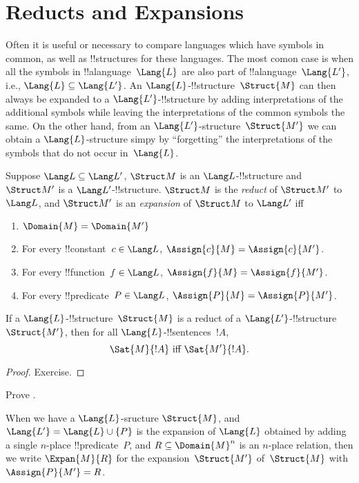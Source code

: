 \documentclass[../../include/open-logic-section]{subfiles}
\begin{document}
\section{Reducts and Expansions}

Often it is useful or necessary to compare languages which have
symbols in common, as well as !!{structure}s for these languages.  The
most comon case is when all the symbols in !!a{language}~$\Lang{L}$
are also part of !!a{language}~$\Lang{L'}$, i.e., $\Lang{L} \subseteq
\Lang{L'}$. An $\Lang{L}$-!!{structure}~$\Struct{M}$ can then always
be expanded to a $\Lang{L'}$-!!{structure} by adding interpretations
of the additional symbols while leaving the interpretations of the
common symbols the same.  On the other hand, from an
$\Lang{L'}$-structure~$\Struct{M'}$ we can obtain a
$\Lang{L}$-structure simpy by ``forgetting'' the interpretations of
the symbols that do not occur in~$\Lang{L}$.

\begin{defn}
Suppose $\Lang L \subseteq \Lang L'$, $\Struct M$ is an
$\Lang L$-!!{structure} and $\Struct M'$ is a $\Lang L'$-!!{structure}.
$\Struct M$ is the \emph{reduct} of $\Struct M'$ to $\Lang L$, and
$\Struct M'$ is an \emph{expansion} of $\Struct M$ to $\Lang L'$ iff
\begin{enumerate}
\item $\Domain{M} = \Domain{M'}$
\item For every !!{constant}~$c \in \Lang L$, $\Assign{c}{M} =
  \Assign{c}{M'}$.
\item For every !!{function}~$f \in \Lang L$, $\Assign{f}{M} =
  \Assign{f}{M'}$.
\item For every !!{predicate}~$P \in \Lang L$, $\Assign{P}{M} =
  \Assign{P}{M'}$.
\end{enumerate}
\end{defn}

\begin{prop}
If a $\Lang{L}$-!!{structure}~$\Struct{M}$ is a reduct of a
$\Lang{L'}$-!!{structure} $\Struct{M'}$, then for all
$\Lang{L}$-!!{sentence}s~$!A$,
\[
\Sat{M}{!A} \text{ iff } \Sat{M'}{!A}.
\]
\end{prop}

\begin{proof}
  Exercise.
\end{proof}

\begin{prob}
Prove .
\end{prob}

When we have a $\Lang{L}$-sructure $\Struct{M}$, and $\Lang{L'} =
\Lang{L} \cup \{P\}$ is the expansion of $\Lang{L}$ obtained by adding
a single $n$-place !!{predicate}~$P$, and $R \subseteq \Domain{M}^n$
is an $n$-place relation, then we write $\Expan{M}{R}$ for the
expansion~$\Struct{M'}$ of~$\Struct{M}$ with $\Assign{P}{M'} = R$.
\end{document}
